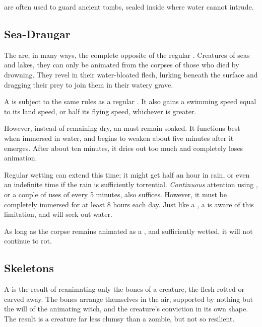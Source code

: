  are often used to guard ancient tombs, sealed inside where water cannot intrude.

\subsection{Sea-Draugar}

The  are, in many ways, the complete opposite of the regular .
Creatures of seas and lakes, they can only be animated from the corpses of those who died by drowning.
They revel in their water-bloated flesh, lurking beneath the surface and dragging their prey to join them in their watery grave.

A  is subject to the same rules as a regular .
It also gains a swimming speed equal to its land speed, or half its flying speed, whichever is greater.

However, instead of remaining dry, an  must remain soaked.
It functions best when immersed in water, and begins to weaken about five minutes after it emerges.
After about ten minutes, it dries out too much and completely loses animation.

Regular wetting can extend this time; it might get half an hour in rain, or even an indefinite time if the rain is sufficiently torrential.
\emph{Continuous} attention using , or a couple of uses of  every 5 minutes, also suffices.
However, it must be completely immersed for at least 8 hours each day.
Just like a , a  is aware of this limitation, and will seek out water.

As long as the corpse remains animated as a , and sufficiently wetted, it will not continue to rot.

\subsection{Skeletons}

A  is the result of reanimating only the bones of a creature, the flesh rotted or carved away.
The bones arrange themselves in the air, supported by nothing but the will of the animating witch, and the creature's conviction in its own shape.
The result is a creature far less clumsy than a zombie, but not so resilient.

